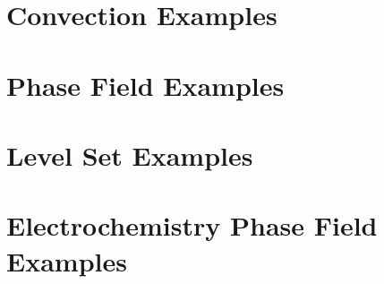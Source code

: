 \documentclass[letterpaper]{book}
\begin{document}
\chapter{Convection Examples}


\newpage

\newpage

\newpage

\newpage

\newpage

\chapter{Phase Field Examples}


\newpage

\newpage

\newpage

\newpage

\newpage

\newpage

\newpage

\newpage

\chapter{Level Set Examples}


\newpage

\newpage

\newpage

\newpage

\newpage

\newpage

\chapter{Electrochemistry Phase Field Examples}
\end{document}
